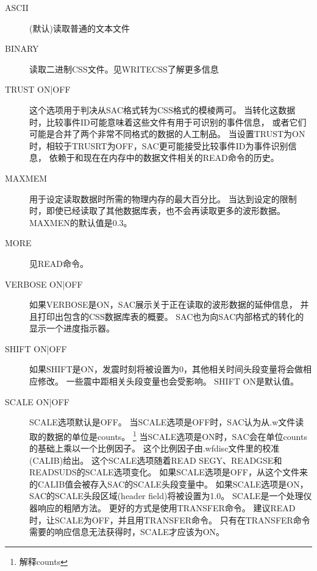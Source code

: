 \begin{description}
\item [ASCII] (默认)读取普通的文本文件
\item [BINARY] 读取二进制CSS文件。见WRITECSS了解更多信息
\item [TRUST ON|OFF] 这个选项用于判决从SAC格式转为CSS格式的模棱两可。
    当转化这数据时，比较事件ID可能意味着这些文件有用于可识别的事件信息，
    或者它们可能是合并了两个非常不同格式的数据的人工制品。
    当设置TRUST为ON时，相较于TRUSRT为OFF，SAC更可能接受比较事件ID为事件识别信息，
    依赖于和现在在内存中的数据文件相关的READ命令的历史。%
\item [MAXMEM]用于设定读取数据时所需的物理内存的最大百分比。
    当达到设定的限制时，即使已经读取了其他数据库表，也不会再读取更多的波形数据。
    MAXMEN的默认值是0.3。
\item [MORE] 见READ命令。
\item [VERBOSE ON|OFF] 如果VERBOSE是ON，SAC展示关于正在读取的波形数据的延伸信息，
    并且打印出包含的CSS数据库表的概要。
    SAC也为向SAC内部格式的转化的显示一个进度指示器。
\item [SHIFT ON|OFF] 如果SHIFT是ON，发震时刻将被设置为0，其他相关时间头段变量将会做相应修改。
    一些震中距相关头段变量也会受影响。
    SHIFT ON是默认值。
\item [SCALE ON|OFF] SCALE选项默认是OFF。
    当SCALE选项是OFF时，SAC认为从.w文件读取的数据的单位是counts。
    \footnote{解释counts}
    当SCALE选项是ON时，SAC会在单位counts的基础上乘以一个比例因子。
    这个比例因子由.wfdisc文件里的校准(CALIB)给出。
    这个SCALE选项随着READ SEGY、READGSE和READSUDS的SCALE选项变化。
    如果SCALE选项是OFF，从这个文件来的CALIB值会被存入SAC的SCALE头段变量中。
    如果SCALE选项是ON，SAC的SCALE头段区域(header field)将被设置为1.0。
    SCALE是一个处理仪器响应的粗陋方法。
    更好的方式是使用TRANSFER命令。
    建议READ时，让SCALE为OFF，并且用TRANSFER命令。
    只有在TRANSFER命令需要的响应信息无法获得时，SCALE才应该为ON。

\end{description}
